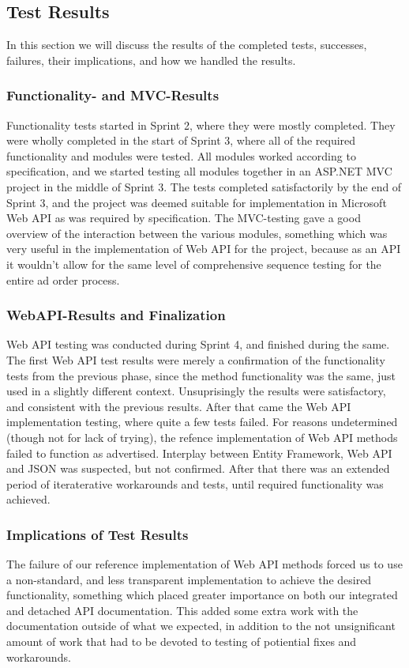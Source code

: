 \subsection{Test Results}

In this section we will discuss the results of the completed tests, successes, failures, their implications, and how we handled the results. 

\subsubsection{Functionality- and MVC-Results}

Functionality tests started in Sprint 2, where they were mostly completed. They were wholly completed in the start of Sprint 3, where all of the required
functionality and modules were tested. All modules worked according to specification, and we started testing all modules together in an ASP.NET MVC project
in the middle of Sprint 3. The tests completed satisfactorily by the end of Sprint 3, and the project was deemed suitable for implementation in Microsoft Web API
as was required by specification.
The MVC-testing gave a good overview of the interaction between the various modules, something which was very useful in the implementation of Web API for the project,
because as an API it wouldn't allow for the same level of comprehensive sequence testing for the entire ad order process.

\subsubsection{WebAPI-Results and Finalization}

Web API testing was conducted during Sprint 4, and finished during the same. The first Web API test results were merely a confirmation of the functionality tests from the previous phase, since the method functionality was the same, just used in a slightly different context. Unsuprisingly the results were satisfactory, and consistent with the previous results.
After that came the Web API implementation testing, where quite a few tests failed. For reasons undetermined (though not for lack of trying), the refence implementation of Web API
methods failed to function as advertised. Interplay between Entity Framework, Web API and JSON was suspected, but not confirmed. After that there was an extended period of iteraterative
workarounds and tests, until required functionality was achieved.


\subsubsection{Implications of Test Results}

The failure of our reference implementation of Web API methods forced us to use a non-standard, and less transparent implementation to achieve the desired functionality,
something which placed greater importance on both our integrated and detached API documentation. This added some extra work with the documentation outside of what we expected,
in addition to the not unsignificant amount of work that had to be devoted to testing of potiential fixes and workarounds. 


